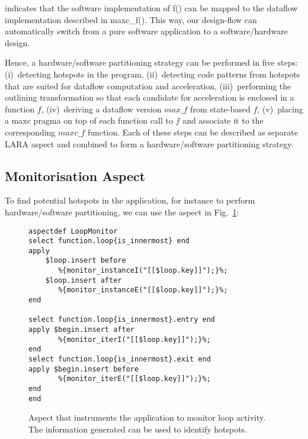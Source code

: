 \noindent indicates that the software implementation of f() can be mapped to the dataflow implementation described in maxc\_f(). This way, our design-flow can automatically switch from 
a pure software application to a software/hardware design.

Hence, a hardware/software partitioning strategy can be performed in five steps: (i)~detecting hotspots in the program, (ii)~detecting code patterns from hotspots that are suited for dataflow computation and acceleration, (iii)~performing the outlining transformation so that each candidate for acceleration is enclosed in a function $f$, (iv)~deriving a dataflow version $max\_f$ from state-based $f$, (v)~placing a maxc pragma on top of each function call to $f$ and associate it to the corresponding $maxc\_f$ function. Each of these steps can be described as separate LARA aspect and combined to form a hardware/software partitioning strategy.

\subsection{Monitorisation Aspect}
\label{sect:asp_mon}
To find potential hotspots in the application, for instance to perform hardware/software partitioning, we can use the aspect in Fig.~\ref{fig:hotspot}:

\lstset{style=lara}
\begin{figure}[!h]
\begin{lstlisting}
aspectdef LoopMonitor
select function.loop{is_innermost} end
apply
    $loop.insert before
       %{monitor_instanceI("[[$loop.key]]");}%;
    $loop.insert after
       %{monitor_instanceE("[[$loop.key]]");}%;
end

select function.loop{is_innermost}.entry end
apply $begin.insert after
       %{monitor_iterI("[[$loop.key]]");}%;
end
select function.loop{is_innermost}.exit end
apply $begin.insert before
       %{monitor_iterE("[[$loop.key]]");}%;
end
end
\end{lstlisting}
\caption{Aspect that instruments the application to monitor loop activity. The information generated can be used to identify hotspots.}
\label{fig:hotspot}
\end{figure}

